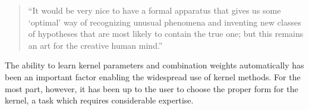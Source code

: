 \documentclass[twoside]{article}
\begin{document}
\begin{quotation}
``It would be very nice to have a formal apparatus that gives us some `optimal' way of recognizing unusual phenomena and inventing new classes of hypotheses that are most likely to contain the true one; but this remains an art for the creative human mind.''

\hspace*{\fill}\citet{Jaynes85highlyinformative}


\end{quotation}


%


The ability to learn kernel parameters and combination weights automatically has been an important factor enabling the widespread use of kernel methods.
For the most part, however, it has been up to the user to choose the proper form for the kernel, a task which requires considerable expertise.
\end{document}

